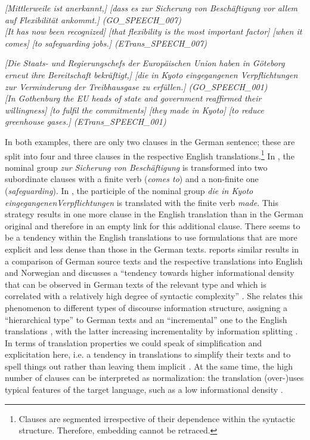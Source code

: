 \documentclass[output=paper]{LSP/langsci}
\begin{document}
\ea \label{ex:culo:12}
  \ea \textit{[Mittlerweile ist anerkannt,] [dass es zur Sicherung von Beschäftigung vor allem auf   Flexibilität ankommt.] \textup{(GO\_SPEECH\_007)}}\\
  
\newpage 
    \ex \textit{[It has now been recognized] [that flexibility is the most important factor] [when it comes] [to safeguarding jobs.] \textup{(ETrans\_SPEECH\_007)}}
    \z
\z 

\ea \label{ex:culo:13}
   \ea \textit{[Die Staats- und Regierungschefs der Europäischen Union haben in Göteborg erneut   ihre Bereitschaft bekräftigt,] [die in Kyoto eingegangenen Verpflichtungen zur   Verminderung der Treibhausgase zu erfüllen.] \textup{(GO\_SPEECH\_001)}}\\
   \ex \textit{[In Gothenburg the EU heads of state and government reaffirmed their willingness] [to fulfil the commitments] [they made in Kyoto] [to reduce greenhouse gases.] \textup{(ETrans\_SPEECH\_001)}}
   \z
\z

In both examples, there are only two clauses in the German sentence; these are split into four and three clauses in the respective English translations.\footnote{Clauses are segmented irrespective of their dependence within the syntactic structure. Therefore, embedding cannot be retraced.} In , the nominal group \textit{zur Sicherung von Beschäftigung} is transformed into two subordinate clauses with a finite verb (\textit{comes to}) and a non-finite one (\textit{safeguarding}). In , the participle of the nominal group \textit{die in Kyoto }\textit{eingegangenen}\textit{Verpflichtungen} is translated with the finite verb \textit{made}. This strategy results in one more clause in the English translation than in the German original and therefore in an empty link for this additional clause. There seems to be a tendency within the English translations to use formulations that are more explicit and less dense than those in the German texts. \citet{Fabricius-Hansen1998} reports similar results in a comparison of German source texts and the respective translations into English and Norwegian and discusses a ``tendency towards higher informational density that can be observed in German texts of the relevant type and which is correlated with a relatively high degree of syntactic complexity'' \citep[197]{Fabricius-Hansen1998}. She relates this phenomenon to different types of discourse information structure, assigning a ``hierarchical type'' to German texts and an ``incremental'' one to the English translations \citep[202--203]{Fabricius-Hansen1998}, with the latter increasing incrementality by information splitting \citep[231]{Fabricius-Hansen1998}. In terms of translation properties we could speak of simplification and explicitation here, i.e. a tendency in translations to simplify their texts and to spell things out rather than leaving them implicit \citep[180-181]{Baker1996}. At the same time, the high number of clauses can be interpreted as normalization: the translation (over-)uses typical features of the target language, such as a low informational density \citep[183]{Baker1996}.
\end{document}
